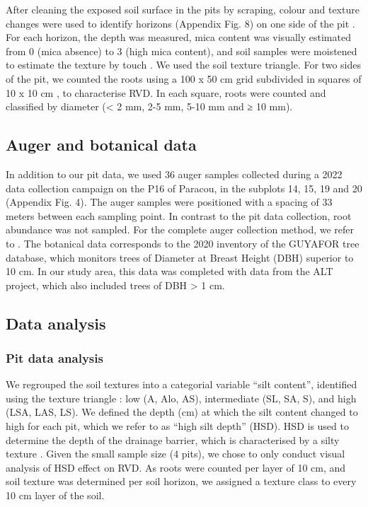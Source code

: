\documentclass[fleqn,11pt]{latex/stylish_article} %
\begin{document}
After cleaning the exposed soil surface in the pits by scraping, colour and texture changes were used to identify horizons (Appendix Fig. 8) on one side of the pit \citep{ferryGeneseFonctionnementHydrique2003}. For each horizon, the depth was measured, mica content was visually estimated from 0 (mica absence) to 3 (high mica content), and soil samples were moistened to estimate the texture by touch \citep{jahnGuidelinesSoilDescription2006}. We used the \citet{jamagneSoilMappingVital1977} soil texture triangle. For two sides of the pit, we counted the roots using a 100 x 50 cm grid subdivided in squares of 10 x 10 cm \citep{freschetStartingGuideRoot2021}, to characterise RVD. In each square, roots were counted and classified by diameter (\textless{} 2 mm, 2-5 mm, 5-10 mm and ≥ 10 mm).

\hypertarget{auger-and-botanical-data}{%
\subsection{Auger and botanical data}\label{auger-and-botanical-data}}

In addition to our pit data, we used 36 auger samples collected during a 2022 data collection campaign on the P16 of Paracou, in the subplots 14, 15, 19 and 20 (Appendix Fig. 4). The auger samples were positioned with a spacing of 33 meters between each sampling point. In contrast to the pit data collection, root abundance was not sampled. For the complete auger collection method, we refer to \citet{dognypietteAbioticFactorsRelated}.
The botanical data corresponds to the 2020 inventory of the GUYAFOR tree database, which monitors trees of Diameter at Breast Height (DBH) superior to 10 cm. In our study area, this data was completed with data from the ALT project, which also included trees of DBH \textgreater{} 1 cm.

\hypertarget{data-analysis}{%
\subsection{Data analysis}\label{data-analysis}}

\hypertarget{pit-data-analysis}{%
\subsubsection{Pit data analysis}\label{pit-data-analysis}}

We regrouped the soil textures into a categorial variable \enquote{silt content}, identified using the texture triangle \citep{jamagneSoilMappingVital1977}: low (A, Alo, AS), intermediate (SL, SA, S), and high (LSA, LAS, LS). We defined the depth (cm) at which the silt content changed to high for each pit, which we refer to as \enquote{high silt depth} (HSD). HSD is used to determine the depth of the drainage barrier, which is characterised by a silty texture \citep{ferryGeneseFonctionnementHydrique2003, humbelCaracterisationParMesures1978}. Given the small sample size (4 pits), we chose to only conduct visual analysis of HSD effect on RVD. As roots were counted per layer of 10 cm, and soil texture was determined per soil horizon, we assigned a texture class to every 10 cm layer of the soil.
\end{document}
